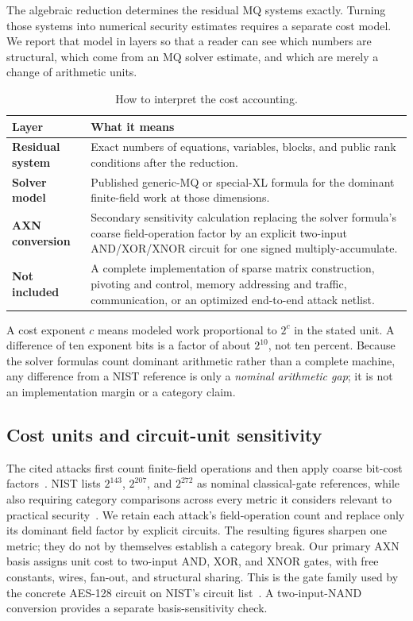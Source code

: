 \documentclass[11pt]{article}
\begin{document}
The algebraic reduction determines the residual MQ systems exactly.  Turning
those systems into numerical security estimates requires a separate cost
model.  We report that model in layers so that a reader can see which numbers
are structural, which come from an MQ solver estimate, and which are merely a
change of arithmetic units.

\begin{table}[H]
\centering
\caption{How to interpret the cost accounting.}
\label{tab:cost-layers}
\small
\renewcommand{\arraystretch}{1.12}
\begin{tabularx}{0.96\textwidth}{@{}>{\bfseries}p{}X@{}}
\toprule
Layer & What it means\\
\midrule
Residual system & Exact numbers of equations, variables, blocks, and public
rank conditions after the reduction.\\
Solver model & Published generic-MQ or special-XL formula for the dominant
finite-field work at those dimensions.\\
AXN conversion & Secondary sensitivity calculation replacing the solver
formula's coarse field-operation factor by an explicit two-input
AND/XOR/XNOR circuit for one signed multiply-accumulate.\\
Not included & A complete implementation of sparse matrix construction,
pivoting and control, memory addressing and traffic, communication, or an
optimized end-to-end attack netlist.\\
\bottomrule
\end{tabularx}
\end{table}

A cost exponent $c$ means modeled work proportional to $2^c$ in the stated
unit.  A difference of ten exponent bits is a factor of about $2^{10}$, not ten
percent.  Because the solver formulas count dominant arithmetic rather than a
complete machine, any difference from a NIST reference is only a
\emph{nominal arithmetic gap}; it is not an implementation margin or a
category claim.

\subsection{Cost units and circuit-unit sensitivity}\label{sec:units}

The cited attacks first count finite-field operations and then apply coarse
bit-cost factors~\cite{Beullens2024SNOVA,Cabarcas2025SNOVA}.  NIST lists
$2^{143}$, $2^{207}$, and $2^{272}$ as nominal classical-gate references, while
also requiring category comparisons across every metric it considers relevant
to practical security~\cite{NISTPQCCriteria}.  We retain each attack's
field-operation count and replace only its dominant field factor by explicit
circuits.  The resulting figures sharpen one metric; they do not by themselves
establish a category break.  Our primary AXN basis assigns unit cost to two-input
AND, XOR, and XNOR gates, with free constants, wires, fan-out, and structural
sharing.  This is the gate family used by the concrete AES-128 circuit on
NIST's circuit list~\cite{NISTCircuitComplexity}.  A two-input-NAND conversion
provides a separate basis-sensitivity check.
\end{document}
